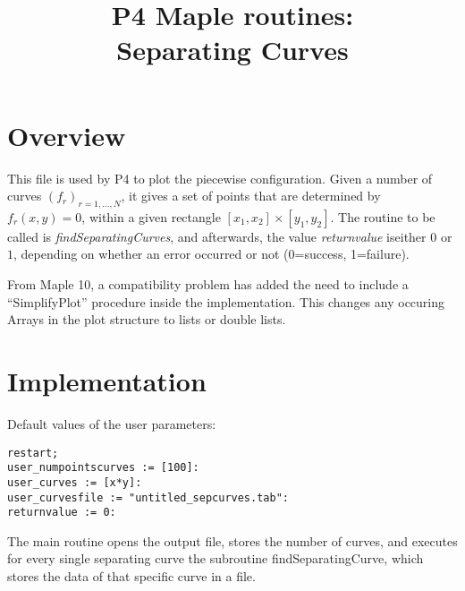 \documentclass[a4paper,10pt]{article}
\title{P4 Maple routines:\\Separating Curves}
\author{}
\date{}
\begin{document}
\maketitle

\section{Overview}

This file is used by P4 to plot the piecewise configuration. Given a number of
curves $(f_r)_{r=1,\dots,N}$, it gives a set of points that are determined by
$f_r(x,y)=0$, within a given rectangle $[x_1,x_2]\times[y_1,y_2]$. The routine
to be called is \emph{findSeparatingCurves}, and afterwards, the value
\emph{returnvalue} iseither $0$ or $1$, depending on whether an error occurred
or not (0=success, 1=failure).

From Maple 10, a compatibility problem has added the need to include a
``SimplifyPlot'' procedure inside the implementation. This changes any occuring
Arrays in the plot structure to lists or double lists.

\section{Implementation}

Default values of the user parameters:

\begin{lstlisting}[name=p4gcf]
restart;
user_numpointscurves := [100]:
user_curves := [x*y]:
user_curvesfile := "untitled_sepcurves.tab":
returnvalue := 0:
\end{lstlisting}

The main routine opens the output file, stores the number of curves, and
executes for every single separating curve the subroutine findSeparatingCurve,
which stores the data of that specific curve in a file.
\end{document}
